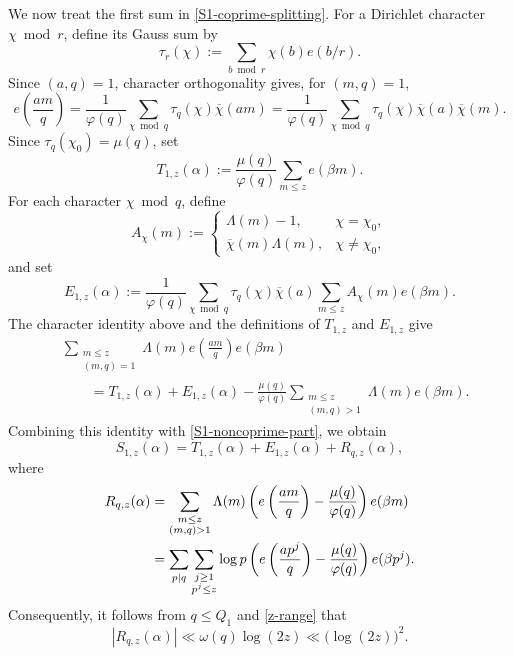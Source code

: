 \documentclass[12pt,reqno]{amsart}
\numberwithin{equation}{section}
\theoremstyle{plain}
\theoremstyle{remark}
\begin{document}
We now treat the first sum in \eqref{S1-coprime-splitting}.  For a
Dirichlet character $\chi\bmod r$, define its Gauss sum by
\[
 \tau_r(\chi)
 :=
 \sum_{b\bmod r}\chi(b)e(b/r).
\]
Since $(a,q)=1$, character orthogonality gives, for $(m,q)=1$,
\begin{equation}\label{character-expansion}
e\left(\frac{am}{q}\right)
 =
 \frac{1}{\varphi(q)}
 \sum_{\chi\bmod q}
 \tau_q(\chi)\overline{\chi}(am)
 =
 \frac{1}{\varphi(q)}
 \sum_{\chi\bmod q}
 \tau_q(\chi)\overline{\chi}(a)\overline{\chi}(m).
\end{equation}
Since $\tau_q(\chi_0)=\mu(q)$, set
\[
 T_{1,z}(\alpha)
 :=
 \frac{\mu(q)}{\varphi(q)}
 \sum_{m\leq z}e(\beta m).
\]
For each character $\chi\bmod q$, define
\begin{equation}\label{def Achi}
 A_\chi(m):=
 \begin{cases}
  \Lambda(m)-1, & \chi=\chi_0,\\
  \overline{\chi}(m)\Lambda(m), & \chi\neq\chi_0,
 \end{cases}
\end{equation}
and set
\[
 E_{1,z}(\alpha)
 :=
 \frac{1}{\varphi(q)}
 \sum_{\chi\bmod q}
 \tau_q(\chi)\overline{\chi}(a)
 \sum_{m\leq z}A_\chi(m)e(\beta m).
\]
The character identity above and the definitions of $T_{1,z}$ and
$E_{1,z}$ give
\begin{align*}
 &\sum_{\substack{m\leq z\\(m,q)=1}}
 \Lambda(m)e\left(\frac{am}{q}\right)e(\beta m)\\
 &\qquad=
 T_{1,z}(\alpha)+E_{1,z}(\alpha)
 -
 \frac{\mu(q)}{\varphi(q)}
 \sum_{\substack{m\leq z\\(m,q)>1}}
 \Lambda(m)e(\beta m).
\end{align*}
Combining this identity with \eqref{S1-noncoprime-part}, we obtain
\begin{equation}\label{S1-decomposition}
 S_{1,z}(\alpha)
 =
 T_{1,z}(\alpha)+E_{1,z}(\alpha)+R_{q,z}(\alpha),
\end{equation}
where
\begin{align*}
 R_{q,z}(\alpha)
 &=
 \sum_{\substack{m\leq z\\(m,q)>1}}
 \Lambda(m)
 \left(
  e\left(\frac{am}{q}\right)
  -\frac{\mu(q)}{\varphi(q)}
 \right)e(\beta m)
 \notag\\
 &=
 \sum_{p\mid q}
 \sum_{\substack{j\geq1\\p^j\leq z}}
 \log p
 \left(
  e\left(\frac{ap^j}{q}\right)
  -\frac{\mu(q)}{\varphi(q)}
 \right)e(\beta p^j).
 \label{S1-remainder}
\end{align*}
Consequently, it follows from $q\leq Q_1$ and \eqref{z-range} that
\begin{equation*}\label{S1-remainder-bound}
 |R_{q,z}(\alpha)|
 \ll \omega(q)\log(2z)
 \ll \bigl(\log(2z)\bigr)^2.
\end{equation*}
\end{document}
